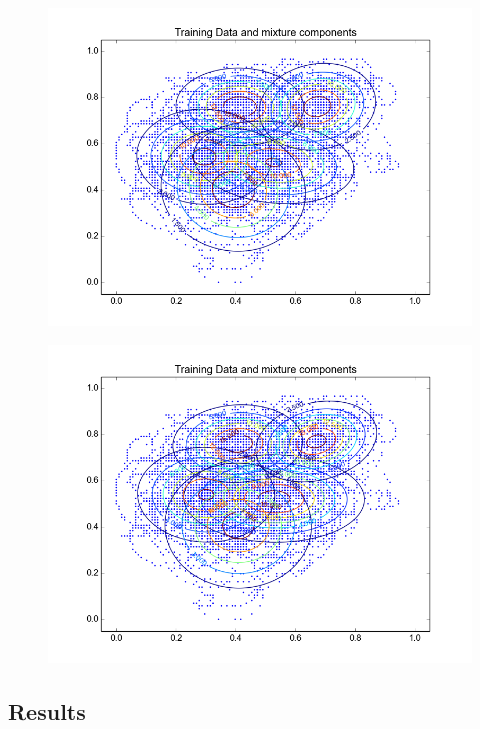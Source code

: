 \documentclass[11pt,a4paper]{article}
\begin{document}
\begin{minipage}[b]{0.25\textwidth}
\begin{figure}[H]
  \centering
  \includegraphics[width=.8\linewidth]{Figures/contours_tA.test10.png}

  \label{fig:sfig1}
\end{figure}%
\end{minipage}
\begin{minipage}[b]{0.25\textwidth}
\begin{figure}[H]
  \centering
  \includegraphics[width=.8\linewidth]{Figures/contours_tA.test15.png}

  \label{fig:sfig1}
\end{figure}%
\end{minipage}


\subsection{Results}
\end{document}
